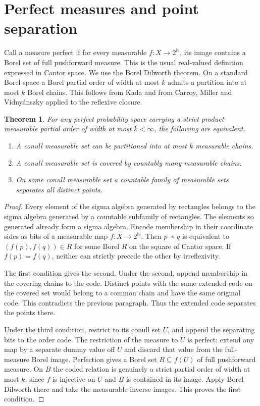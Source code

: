 \documentclass[11pt]{article}
\newtheorem{theorem}{Theorem}
\begin{document}
\section{Perfect measures and point separation}
Call a measure perfect if for every measurable $f:X\to 2^{\mathbb N}$, its image contains a Borel set of full pushforward measure. This is the usual real-valued definition expressed in Cantor space. We use the Borel Dilworth theorem. On a standard Borel space a Borel partial order of width at most $k$ admits a partition into at most $k$ Borel chains. This follows from Kada and from Carroy, Miller and Vidny\'anszky \cite[Theorem 1]{cmv} applied to the reflexive closure.

\begin{theorem}\label{positive}
For any perfect probability space carrying a strict product-measurable partial order of width at most $k<\infty$, the following are equivalent.
\begin{enumerate}
\item A conull measurable set can be partitioned into at most $k$ measurable chains.
\item A conull measurable set is covered by countably many measurable chains.
\item On some conull measurable set a countable family of measurable sets separates all distinct points.
\end{enumerate}
\end{theorem}
\begin{proof}
Every element of the sigma algebra generated by rectangles belongs to the sigma algebra generated by a countable subfamily of rectangles. The elements so generated already form a sigma algebra. Encode membership in their coordinate sides as bits of a measurable map $f:X\to2^{\mathbb N}$. Then $p\prec q$ is equivalent to $(f(p),f(q))\in R$ for some Borel $R$ on the square of Cantor space. If $f(p)=f(q)$, neither can strictly precede the other by irreflexivity.

The first condition gives the second. Under the second, append membership in the covering chains to the code. Distinct points with the same extended code on the covered set would belong to a common chain and have the same original code. This contradicts the previous paragraph. Thus the extended code separates the points there.

Under the third condition, restrict to its conull set $U$, and append the separating bits to the order code. The restriction of the measure to $U$ is perfect: extend any map by a separate dummy value off $U$ and discard that value from the full-measure Borel image. Perfection gives a Borel set $B\subseteq f(U)$ of full pushforward measure. On $B$ the coded relation is genuinely a strict partial order of width at most $k$, since $f$ is injective on $U$ and $B$ is contained in its image. Apply Borel Dilworth there and take the measurable inverse images. This proves the first condition.
\end{proof}
\end{document}
